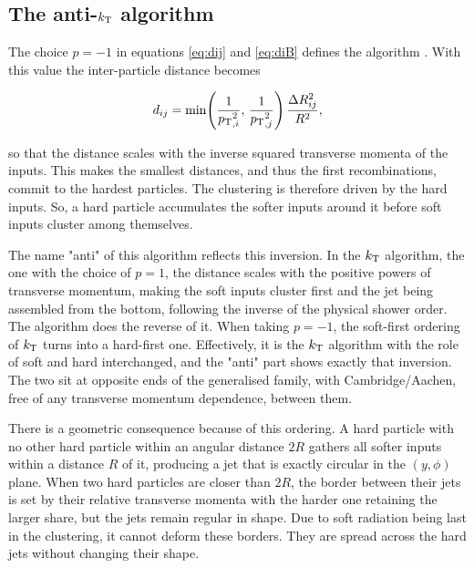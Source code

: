 \subsection{The anti-$k_{\mathrm{T}}$ algorithm}
\label{sec:antikt}

The choice $p = -1$ in equations \eqref{eq:dij} and \eqref{eq:diB} defines the \antikt{}
algorithm \cite{Cacciari_2008}. With this value the inter-particle distance becomes

\begin{equation}
  d_{ij} = \min\!\left( \frac{1}{p_{\mathrm{T}}{}_{,i}^{2}},\, \frac{1}{p_{\mathrm{T}}{}_{,j}^{2}} \right)
           \frac{\Delta R_{ij}^2}{R^2},
  \label{eq:antikt-distance}
\end{equation}

so that the distance scales with the inverse squared transverse momenta of
the inputs. This makes the smallest distances, and thus the first recombinations,
commit to the hardest particles. The clustering is therefore driven by the hard inputs.
So, a hard particle accumulates the softer inputs around it before soft inputs
cluster among themselves.

The name "anti" of this algorithm reflects this inversion. In the $k_{\mathrm{T}}$ algorithm,
the one with the choice of $p=1$, the distance scales with the positive powers of
transverse momentum, making the soft inputs cluster first and the jet being assembled from
the bottom, following the inverse of the physical shower order. The \antikt{} algorithm
does the reverse of it. When taking $p=-1$, the soft-first ordering of $k_{\mathrm{T}}$ turns
into a hard-first one. Effectively, it is the $k_{\mathrm{T}}$ algorithm with the 
role of soft and hard interchanged, and the "anti" part shows exactly that
inversion. The two sit at opposite ends of the generalised family, with
Cambridge/Aachen, free of any transverse momentum dependence, between them.

There is a geometric consequence because of this ordering. A hard particle with
no other hard particle within an angular distance $2R$ gathers all softer inputs
within a distance $R$ of it, producing a jet that is exactly circular in the $(y,\phi)$
plane. When two hard particles are closer than $2R$, the border between their jets
is set by their relative transverse momenta with the harder one retaining the larger
share, but the jets remain regular in shape. Due to soft radiation being last in the
clustering, it cannot deform these borders. They are spread across the hard jets 
without changing their shape.

